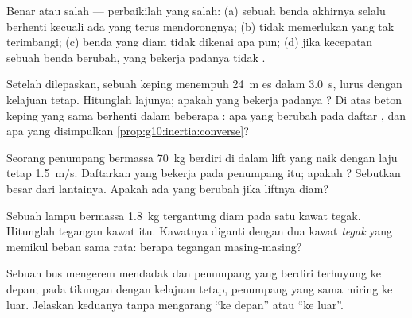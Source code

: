\begin{exercise}[$\star$]\label{exo:g10:inertia:5}
Benar atau salah --- perbaikilah yang salah: (a) sebuah benda akhirnya
selalu berhenti kecuali ada  yang terus mendorongnya; (b)  tidak memerlukan  yang tak terimbangi; (c) benda
yang diam tidak dikenai  apa pun; (d) jika kecepatan sebuah benda
berubah,  yang bekerja padanya tidak .
\end{exercise}

\begin{exercise}[$\star\star$]\label{exo:g10:inertia:6}
Setelah dilepaskan, sebuah keping menempuh \qty{24}{m} es dalam
\qty{3.0}{s}, lurus dengan kelajuan tetap. Hitunglah lajunya; apakah
 yang bekerja padanya ? Di atas beton keping yang
sama berhenti dalam beberapa : apa yang berubah pada daftar
, dan apa yang disimpulkan
\cref{prop:g10:inertia:converse}?
\end{exercise}

\begin{exercise}[$\star\star$]\label{exo:g10:inertia:7}
Seorang penumpang bermassa \qty{70}{kg} berdiri di dalam lift yang naik
dengan laju tetap \qty{1.5}{m/s}. Daftarkan  yang bekerja pada
penumpang itu; apakah  ? Sebutkan besar 
dari lantainya. Apakah ada yang berubah jika liftnya diam?
\end{exercise}

\begin{exercise}[$\star\star$]\label{exo:g10:inertia:8}
Sebuah lampu bermassa \qty{1.8}{kg} tergantung diam pada satu kawat
tegak. Hitunglah tegangan kawat itu. Kawatnya diganti dengan dua kawat
\emph{tegak} yang memikul beban sama rata: berapa tegangan
masing-masing?
\end{exercise}

\begin{exercise}[$\star\star$]\label{exo:g10:inertia:9}
Sebuah bus mengerem mendadak dan penumpang yang berdiri terhuyung ke
depan; pada tikungan dengan kelajuan tetap, penumpang yang sama miring
ke luar. Jelaskan keduanya tanpa mengarang  ``ke depan'' atau ``ke
luar''.
\end{exercise}

